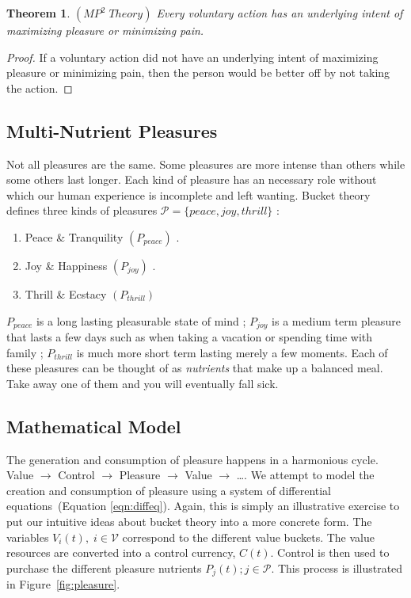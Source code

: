 \documentclass{article}
\newtheorem{theorem}{Theorem}[section]
\begin{document}
\begin{theorem}
\emph{$(MP^2 \; Theory)$}
\label{mp2}
Every voluntary action has an underlying intent of maximizing pleasure or minimizing pain.
\end{theorem}

\begin{proof}
If a voluntary action did not have an underlying intent of maximizing pleasure or minimizing pain, then the person would be better off by not taking the action.
\end{proof}

\subsection{Multi-Nutrient Pleasures}
Not all pleasures are the same. Some pleasures are more intense than others while some others last longer. Each kind of pleasure has an necessary role without which our human experience is incomplete and left wanting. Bucket theory~\cite{bucket2014} defines three kinds of pleasures $ \mathcal{P} = \{peace, joy, thrill \}$ : 
\begin{enumerate}
\item Peace \& Tranquility $(P_{peace})$ .
\item Joy \& Happiness  $(P_{joy})$ .
\item Thrill \& Ecstacy $(P_{thrill})$
\end{enumerate}

$P_{peace}$ is a long lasting pleasurable state of mind ; $P_{joy}$ is a medium term pleasure that lasts a few days such as when taking a vacation or spending time with family ;  $P_{thrill}$ is much more short term lasting merely a few moments.  Each of these pleasures can be thought of as \textit{nutrients} that make up a balanced meal. Take away one of them and you will eventually fall sick.

\subsection{Mathematical Model}
The generation and consumption of pleasure happens in a harmonious cycle. 
Value $\rightarrow$ Control $\rightarrow$ Pleasure $\rightarrow$ Value $\rightarrow$ \ldots.
We attempt to model the creation and consumption of pleasure using a system of differential equations~(Equation \ref{eqn:diffeq}). Again, this is simply an illustrative exercise to put our intuitive ideas about bucket theory into a more concrete form. The variables $V_i(t),\; i\in \mathcal{V}$ correspond to the different value buckets. The value resources are converted into a control currency, $C(t)$. Control is then used to purchase the different pleasure nutrients $P_j(t) ; j\in \mathcal{P}$. This process is illustrated in Figure~\ref{fig:pleasure}.
\end{document}
